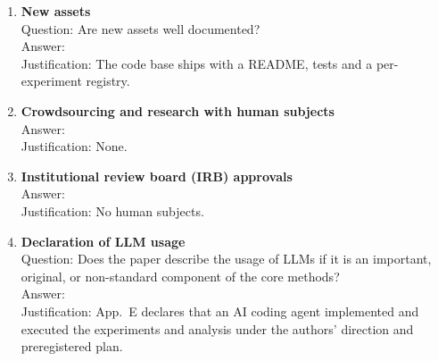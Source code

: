 \begin{enumerate}
\item {\bf New assets} \\ Question: Are new assets well documented? \\ Answer: \answerYes{} \\ Justification: The code base ships with a README, tests and a per-experiment registry.
\item {\bf Crowdsourcing and research with human subjects} \\ Answer: \answerNA{} \\ Justification: None.
\item {\bf Institutional review board (IRB) approvals} \\ Answer: \answerNA{} \\ Justification: No human subjects.
\item {\bf Declaration of LLM usage} \\ Question: Does the paper describe the usage of LLMs if it is an important, original, or non-standard component of the core methods? \\ Answer: \answerYes{} \\ Justification: App.~E declares that an AI coding agent implemented and executed the experiments and analysis under the authors' direction and preregistered plan.
\end{enumerate}

